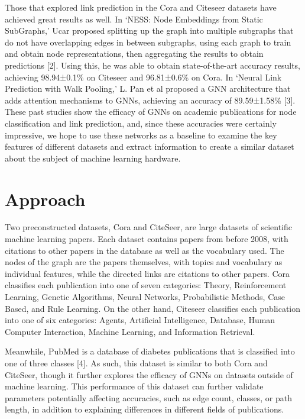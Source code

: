 \documentclass[conference]{IEEEtran}
\begin{document}
Those that explored link prediction in the Cora and Citeseer datasets have achieved great results as well. 
In ‘NESS: Node Embeddings from Static SubGraphs,’ Ucar proposed splitting up the graph into multiple subgraphs 
that do not have overlapping edges in between subgraphs, using each graph to train and obtain node representations, 
then aggregating the results to obtain predictions [2]. Using this, he was able to obtain state-of-the-art accuracy results, 
achieving 98.94±0.1\% on Citeseer and 96.81±0.6\% on Cora. In ‘Neural Link Prediction with Walk Pooling,’ L. 
Pan et al proposed a GNN architecture that adds attention mechanisms to GNNs, achieving an accuracy of 89.59±1.58\% [3]. 
These past studies show the efficacy of GNNs on academic publications for node classification and link prediction, and, 
since these accuracies were certainly impressive, we hope to use these networks as a baseline to examine the key features 
of different datasets and extract information to create a similar dataset about the subject of machine learning hardware.  \par

\section{Approach}

Two preconstructed datasets, Cora and CiteSeer, are large datasets of scientific machine learning papers. 
Each dataset contains papers from before 2008, with citations to other papers in the database as well as the 
vocabulary used. The nodes of the graph are the papers themselves, with topics and vocabulary as individual features, 
while the directed links are citations to other papers. Cora classifies each publication into one of seven categories: 
Theory, Reinforcement Learning, Genetic Algorithms, Neural Networks, Probabilistic Methods, Case Based, and Rule Learning. 
On the other hand, Citeseer classifies each publication into one of six categories: Agents, Artificial Intelligence, Database, 
Human Computer Interaction, Machine Learning, and Information Retrieval. \par

Meanwhile, PubMed is a database of diabetes publications that is classified into one of three classes [4]. As such, this 
dataset is similar to both Cora and CiteSeer, though it further explores the efficacy of GNNs on datasets outside of 
machine learning. This performance of this dataset can further validate parameters potentially affecting accuracies, 
such as edge count, classes, or path length,  in addition to explaining differences in different fields of publications. \par
\end{document}
